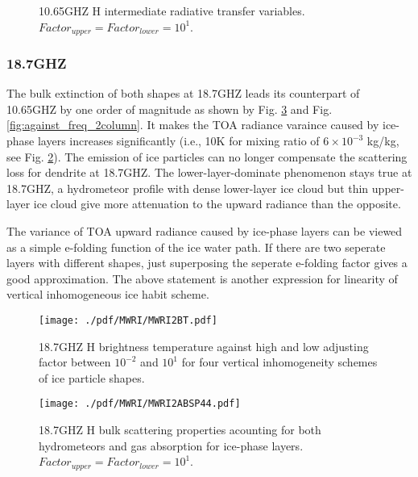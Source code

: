 \begin{figure}[hbtp] 
\centering
{}
\caption{10.65GHZ H intermediate radiative transfer variables. $Factor_{upper} = Factor_{lower} = 10^{1}$.}
\label{fig:MWRI1rad}
\end{figure}

\clearpage

\subsubsection{18.7GHZ}

The bulk extinction of both shapes at 18.7GHZ leads its counterpart of 10.65GHZ by one order of magnitude as shown by 
Fig. \ref{fig:MWRI2ABSP44} and Fig. \ref{fig:against_freq_2column}. It makes the TOA radiance varaince caused by
ice-phase layers increases significantly (i.e., 10K for mixing ratio of $6 \times 10^{-3}$ kg/kg, see Fig. \ref{fig:MWRI2BT}).
The emission of ice particles can no longer compensate the scattering loss for dendrite at 18.7GHZ.
The lower-layer-dominate phenomenon stays true at 18.7GHZ, a hydrometeor profile with dense lower-layer ice cloud but thin upper-layer
ice cloud give more attenuation to the upward radiance than the opposite.


The variance of TOA upward radiance caused by ice-phase layers can be viewed as a simple e-folding function of the ice water path.
If there are two seperate layers with different shapes, just superposing the seperate e-folding factor gives a good approximation.
The above statement is another expression for linearity of vertical inhomogeneous ice habit scheme.

\begin{figure}[hbtp] 
\centering
\texttt{[image: ./pdf/MWRI/MWRI2BT.pdf]}
\caption{18.7GHZ H brightness temperature against high and low adjusting factor between $10^{-2}$ and $10^{1}$ for four vertical 
inhomogeneity schemes of ice particle shapes.}
\label{fig:MWRI2BT}
\end{figure}

\begin{figure}[hbtp] 
\centering
\texttt{[image: ./pdf/MWRI/MWRI2ABSP44.pdf]}
\caption{18.7GHZ H bulk scattering properties acounting for both hydrometeors and gas absorption for ice-phase layers.
$Factor_{upper} = Factor_{lower} = 10^{1}$.}
\label{fig:MWRI2ABSP44}
\end{figure}

